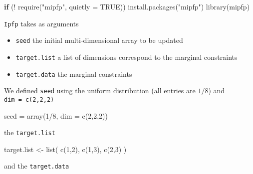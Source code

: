 \documentclass[
]{article}
\newenvironment{Shaded}{\begin{snugshade}}{\end{snugshade}}
\newcommand{\AttributeTok}[1]{\textcolor[rgb]{0.77,0.63,0.00}{#1}}
\newcommand{\ConstantTok}[1]{\textcolor[rgb]{0.00,0.00,0.00}{#1}}
\newcommand{\ControlFlowTok}[1]{\textcolor[rgb]{0.13,0.29,0.53}{\textbf{#1}}}
\newcommand{\DecValTok}[1]{\textcolor[rgb]{0.00,0.00,0.81}{#1}}
\newcommand{\FunctionTok}[1]{\textcolor[rgb]{0.00,0.00,0.00}{#1}}
\newcommand{\NormalTok}[1]{#1}
\newcommand{\OtherTok}[1]{\textcolor[rgb]{0.56,0.35,0.01}{#1}}
\newcommand{\SpecialCharTok}[1]{\textcolor[rgb]{0.00,0.00,0.00}{#1}}
\newcommand{\StringTok}[1]{\textcolor[rgb]{0.31,0.60,0.02}{#1}}
\providecommand{\tightlist}{%
  \setlength{\itemsep}{0pt}\setlength{\parskip}{0pt}}
\begin{document}
\begin{Shaded}
\begin{Highlighting}[]
\ControlFlowTok{if}\NormalTok{ (}\SpecialCharTok{!} \FunctionTok{require}\NormalTok{(}\StringTok{"mipfp"}\NormalTok{, }\AttributeTok{quietly =} \ConstantTok{TRUE}\NormalTok{))}
  \FunctionTok{install.packages}\NormalTok{(}\StringTok{"mipfp"}\NormalTok{)}
\FunctionTok{library}\NormalTok{(mipfp)}
\end{Highlighting}
\end{Shaded}

\texttt{Ipfp} takes as arguments

\begin{itemize}
\tightlist
\item
  \texttt{seed} the initial multi-dimensional array to be updated
\item
  \texttt{target.list} a list of dimensions correspond to the marginal
  constraints
\item
  \texttt{target.data} the marginal constraints
\end{itemize}

We defined \texttt{seed} using the uniform distribution (all entries are
\(1/8\)) and \texttt{dim\ =\ c(2,2,2)}

\begin{Shaded}
\begin{Highlighting}[]
\NormalTok{seed }\OtherTok{=} \FunctionTok{array}\NormalTok{(}\DecValTok{1}\SpecialCharTok{/}\DecValTok{8}\NormalTok{, }\AttributeTok{dim =} \FunctionTok{c}\NormalTok{(}\DecValTok{2}\NormalTok{,}\DecValTok{2}\NormalTok{,}\DecValTok{2}\NormalTok{))}
\end{Highlighting}
\end{Shaded}

the \texttt{target.list}

\begin{Shaded}
\begin{Highlighting}[]
\NormalTok{target.list }\OtherTok{\textless{}{-}} \FunctionTok{list}\NormalTok{(}
  \FunctionTok{c}\NormalTok{(}\DecValTok{1}\NormalTok{,}\DecValTok{2}\NormalTok{),}
  \FunctionTok{c}\NormalTok{(}\DecValTok{1}\NormalTok{,}\DecValTok{3}\NormalTok{),}
  \FunctionTok{c}\NormalTok{(}\DecValTok{2}\NormalTok{,}\DecValTok{3}\NormalTok{)}
\NormalTok{)}
\end{Highlighting}
\end{Shaded}

and the \texttt{target.data}
\end{document}
